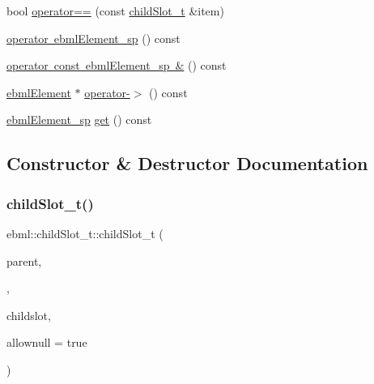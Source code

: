 \begin{DoxyCompactItemize}
bool \mbox{\hyperlink{classebml_1_1childSlot__t_aa6c541a6a2757beadce3ceeb1a4d2358}{operator==}} (const \mbox{\hyperlink{classebml_1_1childSlot__t}{child\+Slot\+\_\+t}} \&item)
\item 
\mbox{\hyperlink{classebml_1_1childSlot__t_aa824ac09e6c87bf304cf2479ba870b40}{operator ebml\+Element\+\_\+sp}} () const
\item 
\mbox{\hyperlink{classebml_1_1childSlot__t_a78d2e16e95c39205b428fdcf775a0d24}{operator const ebml\+Element\+\_\+sp \&}} () const
\item 
\mbox{\hyperlink{classebml_1_1ebmlElement}{ebml\+Element}} $\ast$ \mbox{\hyperlink{classebml_1_1childSlot__t_a275319c9fc40b9c819f9422602442fc9}{operator-\/$>$}} () const
\item 
\mbox{\hyperlink{namespaceebml_adad533b7705a16bb360fe56380c5e7be}{ebml\+Element\+\_\+sp}} \mbox{\hyperlink{classebml_1_1childSlot__t_a12a2bd9fed9f797f01dfcfdb795c0bfe}{get}} () const
\end{DoxyCompactItemize}


\subsection{Constructor \& Destructor Documentation}
\mbox{\label{classebml_1_1childSlot__t_a192a6c2040bab86ad5658aed5f30551d}} 
\subsubsection{\texorpdfstring{child\+Slot\+\_\+t()}{childSlot\_t()}}
{\footnotesize\ttfamily ebml\+::child\+Slot\+\_\+t\+::child\+Slot\+\_\+t (\begin{DoxyParamCaption}\item[{\mbox{\hyperlink{classebml_1_1ebmlMasterElement}{ebml\+Master\+Element}} $\ast$}]{parent,  }\item[{const \mbox{\hyperlink{classebml_1_1childClassSpec__t}{child\+Class\+Spec\+\_\+t}} \&}]{,  }\item[{\mbox{\hyperlink{namespaceebml_adad533b7705a16bb360fe56380c5e7be}{ebml\+Element\+\_\+sp}} \&}]{childslot,  }\item[{bool}]{allownull = {\ttfamily true} }\end{DoxyParamCaption})}



